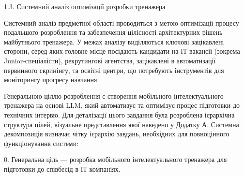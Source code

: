 \protect{}\label{_Toc228981054}{}1.3. Системний аналіз
оптимізації розробки тренажера

Системний аналіз предметної області проводиться з метою оптимізації
процесу подальшого розроблення та забезпечення цілісності архітектурних
рішень майбутнього тренажера. У межах аналізу виділяються ключові
зацікавлені сторони, серед яких головне місце посідають кандидати на
ІТ-вакансії (зокрема Junior-спеціалісти), рекрутингові агентства,
зацікавлені в автоматизації первинного скринінгу, та освітні центри, що
потребують інструментів для моніторингу прогресу навчання.

Генеральною ціллю розроблення є створення мобільного інтелектуального
тренажера на основі LLM, який автоматизує та оптимізує процес підготовки
до технічних інтерв\textquotesingle ю. Для деталізації цього завдання
була розроблена ієрархічна структура цілей, візуальне представлення якої
наведено у Додатку А. Системна декомпозиція визначає чітку ієрархію
завдань, необхідних для повноцінного функціонування системи:

0. Генеральна ціль --- розробка мобільного інтелектуального тренажера
для підготовки до співбесід в ІТ-компаніях.

